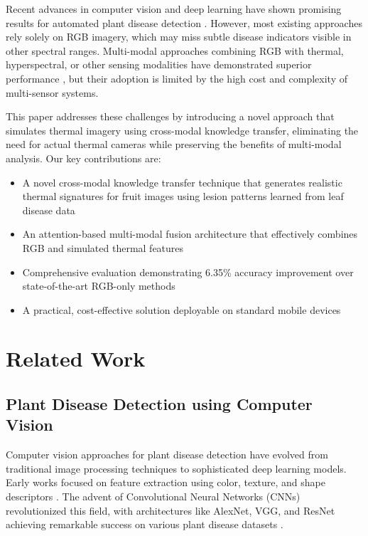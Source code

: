 \documentclass[conference]{IEEEtran}
\begin{document}
Recent advances in computer vision and deep learning have shown promising results for automated plant disease detection \cite{liu2021plant}. However, most existing approaches rely solely on RGB imagery, which may miss subtle disease indicators visible in other spectral ranges. Multi-modal approaches combining RGB with thermal, hyperspectral, or other sensing modalities have demonstrated superior performance \cite{mahlein2018plant}, but their adoption is limited by the high cost and complexity of multi-sensor systems.

This paper addresses these challenges by introducing a novel approach that simulates thermal imagery using cross-modal knowledge transfer, eliminating the need for actual thermal cameras while preserving the benefits of multi-modal analysis. Our key contributions are:

\begin{itemize}
\item A novel cross-modal knowledge transfer technique that generates realistic thermal signatures for fruit images using lesion patterns learned from leaf disease data
\item An attention-based multi-modal fusion architecture that effectively combines RGB and simulated thermal features
\item Comprehensive evaluation demonstrating 6.35\% accuracy improvement over state-of-the-art RGB-only methods
\item A practical, cost-effective solution deployable on standard mobile devices
\end{itemize}

\section{Related Work}

\subsection{Plant Disease Detection using Computer Vision}

Computer vision approaches for plant disease detection have evolved from traditional image processing techniques to sophisticated deep learning models. Early works focused on feature extraction using color, texture, and shape descriptors \cite{phadikar2013rice}. The advent of Convolutional Neural Networks (CNNs) revolutionized this field, with architectures like AlexNet, VGG, and ResNet achieving remarkable success on various plant disease datasets \cite{mohanty2016using}.
\end{document}
